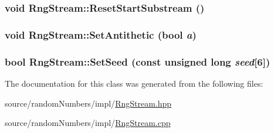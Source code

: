 \hypertarget{classRngStream_b2ffe916a1c584726a7c26ea1defe103}{
\subsubsection[{ResetStartSubstream}]{\setlength{\rightskip}{0pt plus 5cm}void RngStream::ResetStartSubstream ()}}
\label{classRngStream_b2ffe916a1c584726a7c26ea1defe103}


\hypertarget{classRngStream_72bf0888332be543e618d63d8909b3a8}{
\subsubsection[{SetAntithetic}]{\setlength{\rightskip}{0pt plus 5cm}void RngStream::SetAntithetic (bool {\em a})}}
\label{classRngStream_72bf0888332be543e618d63d8909b3a8}


\hypertarget{classRngStream_53e007f5ffda8a9cbc05f5facdfd1993}{
\subsubsection[{SetSeed}]{\setlength{\rightskip}{0pt plus 5cm}bool RngStream::SetSeed (const unsigned long {\em seed}\mbox{[}6\mbox{]})}}
\label{classRngStream_53e007f5ffda8a9cbc05f5facdfd1993}




The documentation for this class was generated from the following files:\begin{CompactItemize}
\item 
source/randomNumbers/impl/\hyperlink{RngStream_8hpp}{RngStream.hpp}\item 
source/randomNumbers/impl/\hyperlink{RngStream_8cpp}{RngStream.cpp}\end{CompactItemize}
